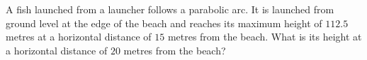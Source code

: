 A fish launched from a launcher follows a parabolic arc. It is launched from ground level at the edge of the beach and reaches its maximum height of $112.5$ metres at a horizontal distance of $15$ metres from the beach. What is its height at a horizontal distance of $20$ metres from the beach?
